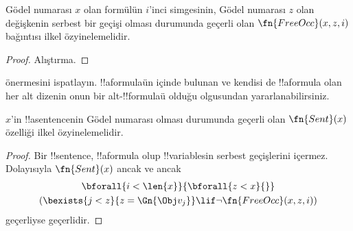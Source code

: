 \begin{prop}
Gödel numarası $x$ olan formülün $i$'inci simgesinin, Gödel numarası $z$
olan değişkenin serbest bir geçişi olması durumunda geçerli olan
$\fn{FreeOcc}(x,z,i)$ bağıntısı ilkel özyinelemelidir.
\end{prop}

\begin{proof}
Alıştırma.
\end{proof}

\begin{prob}
 önermesini ispatlayın.
!!a{formula}{}ün içinde bulunan ve kendisi de !!a{formula} olan her alt
dizenin onun bir alt-!!{formula}{}ü olduğu olgusundan yararlanabilirsiniz.
\end{prob}

\begin{prop}
$x$'in !!a{sentence}{}nin Gödel numarası olması durumunda geçerli olan
$\fn{Sent}(x)$ özelliği ilkel özyinelemelidir.
\end{prop}

\begin{proof}
Bir !!{sentence}, !!a{formula} olup !!{variable}s{}in serbest geçişlerini içermez.
Dolayısıyla $\fn{Sent}(x)$ ancak ve ancak
\begin{multline*}
\bforall{i<\len{x}}{\bforall{z<x}{}}\\
(\bexists{j<z}{z=\Gn{\Obj v_j}} \lif \lnot\fn{FreeOcc}(x,z,i))
\end{multline*}
geçerliyse geçerlidir.
\end{proof}


